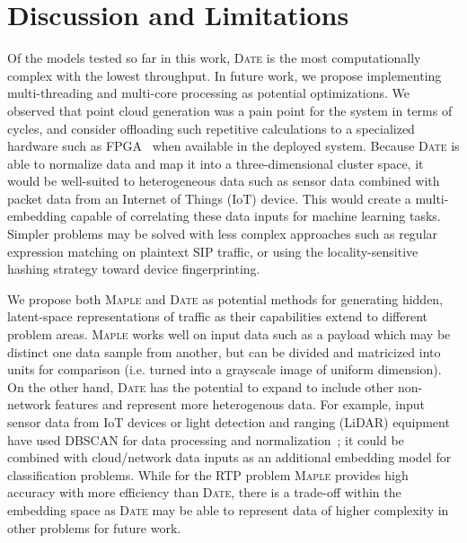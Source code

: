 \section{Discussion and Limitations}

Of the models tested so far in this work, \textsc{Date} is the most computationally complex with the lowest throughput. In future work, we propose implementing multi-threading and multi-core processing as potential optimizations. We observed that point cloud generation was a pain point for the system in terms of cycles, and consider offloading such repetitive calculations to a specialized hardware such as FPGA~\cite{Song2005EfficientPC} when available in the deployed system. Because \textsc{Date} is able to normalize data and map it into a three-dimensional cluster space, it would be well-suited to heterogeneous data such as sensor data combined with packet data from an Internet of Things (IoT) device. This would create a multi-embedding capable of correlating these data inputs for machine learning tasks. Simpler problems may be solved with less complex approaches such as regular expression matching on plaintext SIP traffic, or using the locality-sensitive hashing strategy toward device fingerprinting.

We propose both \textsc{Maple} and \textsc{Date} as potential methods for generating hidden, latent-space representations of traffic as their capabilities extend to different problem areas. \textsc{Maple} works well on input data such as a payload which may be distinct one data sample from another, but can be divided and matricized into units for comparison (i.e. turned into a grayscale image of uniform dimension). On the other hand, \textsc{Date} has the potential to expand to include other non-network features and represent more heterogenous data. For example, input sensor data from IoT devices or light detection and ranging (LiDAR) equipment have used DBSCAN for data processing and normalization~\cite{wanglidar2019}; it could be combined with cloud/network data inputs as an additional embedding model for classification problems. While for the RTP problem \textsc{Maple} provides high accuracy with more efficiency than \textsc{Date}, there is a trade-off within the embedding space as \textsc{Date} may be able to represent data of higher complexity in other problems for future work.
